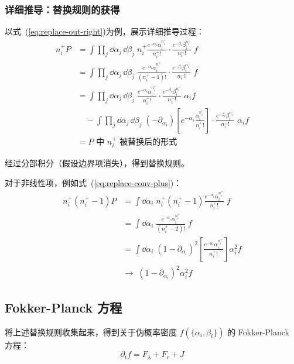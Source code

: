 \subsubsection{详细推导：替换规则的获得}

以式~(\ref{eq:replace-out-right})为例，展示详细推导过程：
\begin{align}
n_i^+ P &= \int \prod_j \dd\alpha_j \, \dd\beta_j \; n_i^+ \frac{e^{-\alpha_i}\alpha_i^{n_i^+}}{n_i^+!} \cdot \frac{e^{-\beta_i}\beta_i^{n_i^-}}{n_i^-!} \; f \nonumber\\
&= \int \prod_j \dd\alpha_j \, \dd\beta_j \; \frac{e^{-\alpha_i}\alpha_i^{n_i^+}}{(n_i^+ - 1)!} \cdot \frac{e^{-\beta_i}\beta_i^{n_i^-}}{n_i^-!} \; f \nonumber\\
&= \int \prod_j \dd\alpha_j \, \dd\beta_j \; \frac{e^{-\alpha_i}\alpha_i^{n_i^+}}{n_i^+!} \cdot \frac{e^{-\beta_i}\beta_i^{n_i^-}}{n_i^-!} \; \alpha_i f \nonumber\\
&\quad - \int \prod_j \dd\alpha_j \, \dd\beta_j \; (-\partial_{\alpha_i})\left[e^{-\alpha_i}\frac{\alpha_i^{n_i^+}}{n_i^+!}\right] \cdot \frac{e^{-\beta_i}\beta_i^{n_i^-}}{n_i^-!} \; \alpha_i f \nonumber\\
&= P \text{ 中 } n_i^+ \text{ 被替换后的形式} \nonumber
\end{align}

经过分部积分（假设边界项消失），得到替换规则。

对于非线性项，例如式~(\ref{eq:replace-conv-plus})：
\begin{align}
n_i^+(n_i^+ - 1)P &= \int \dd\alpha_i \; n_i^+(n_i^+ - 1) \frac{e^{-\alpha_i}\alpha_i^{n_i^+}}{n_i^+!} \; f \nonumber\\
&= \int \dd\alpha_i \; \frac{e^{-\alpha_i}\alpha_i^{n_i^+}}{(n_i^+ - 2)!} \; f \nonumber\\
&= \int \dd\alpha_i \; (1 - \partial_{\alpha_i})^2 \left[\frac{e^{-\alpha_i}\alpha_i^{n_i^+}}{n_i^+!}\right] \alpha_i^2 f \nonumber\\
&\to\; (1 - \partial_{\alpha_i})^2 \alpha_i^2 f \nonumber
\end{align}

\subsection{Fokker-Planck 方程}\label{subsec:fokker-planck}

将上述替换规则收集起来，得到关于伪概率密度 $f(\{\alpha_i, \beta_i\})$ 的 Fokker-Planck 方程：
\begin{equation}\label{eq:fpe}
\boxed{\partial_t f = F_\lambda + F_r + J}
\end{equation}

